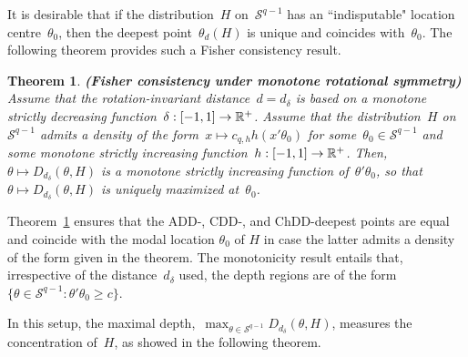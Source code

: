 \documentclass[usenames,dvipsnames]{article}
\newtheorem{thm}{Theorem}
\begin{document}
It is desirable that if the distribution~$H$ on~$\mathcal{S}^{q-1}$ has an ``indisputable" location centre~$\theta_0$, then the deepest point~$\theta_d(H)$ is unique and coincides with~$\theta_0$. The following theorem provides such a Fisher consistency result. 

\begin{thm}{\textbf{(Fisher consistency under monotone rotational symmetry)}} 
\label{thFishconsist}
Assume that the rotation-invariant distance~$d=d_\delta$ is based on a monotone strictly decreasing function~$\delta:[-1,1]\to \mathbb{R}^+$. Assume that the distribution~$H$ on~$\mathcal{S}^{q-1}$ admits a density of the form~$x\mapsto c_{q,h} h(x'\theta_0)$ for some~$\theta_0\in\mathcal{S}^{q-1}$ and some monotone strictly increasing function~$h:[-1,1]\linebreak \to \R^+$. Then, $\theta\mapsto D_{d_{\delta}}(\theta, H)$ is a monotone strictly increasing function of~$\theta'\theta_0$, so that $\theta\mapsto D_{d_{\delta}}(\theta, H)$ is uniquely maximized at~$\theta_0$. 
\end{thm}

Theorem~\ref{thFishconsist} ensures that the ADD-, CDD-, and ChDD-deepest points are equal and coincide with the modal location $\theta_0$ of $H$ in case the latter admits a density of the form given in the theorem.
The monotonicity result entails that, irrespective of the distance~$d_\delta$ used, the depth regions are of the form~$\{\theta\in\mathcal{S}^{q-1}: \theta'\theta_0\geq c\}$. 

In this setup, the maximal depth,~$\max_{\theta\in\mathcal{S}^{q-1}} D_{d_\delta}(\theta,H)$, measures the concentration of~$H$, as showed in the following theorem. 
\end{document}
